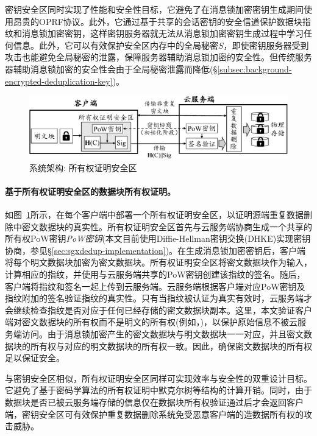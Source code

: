 密钥安全区同时实现了性能和安全性目标，它避免了在消息锁加密密钥生成期间使用昂贵的OPRF协议\cite{bellare2013DupLESS}。此外，它通过基于共享的会话密钥的安全信道保护数据块指纹和消息锁加密密钥，这样密钥服务器就无法从消息锁加密密钥生成过程中学习任何信息。此外，它可以有效保护安全区内存中的全局秘密$S$，即使密钥服务器受到攻击也能避免全局秘密的泄露，保障服务器辅助消息锁加密的安全性。但传统服务器辅助消息锁加密的安全性会由于全局秘密泄露而降低(\S\ref{subsec:background-encrypted-deduplication-key})。

\begin{figure}[!htb]
  \centering
  \includegraphics[width=\textwidth]{pic/sgxdedup/pow.pdf}
  \caption{\sysnameS 系统架构: 所有权证明安全区}
  \label{fig:sgxdedup-overview-pow}
\end{figure}

\paragraph*{基于所有权证明安全区的数据块所有权证明。}如图~\ref{fig:sgxdedup-overview-pow}所示，\sysnameS 在每个客户端中部署一个所有权证明安全区，以证明源端重复数据删除中密文数据块的真实性。所有权证明安全区首先与云服务端协商生成一个共享的所有权PoW密钥\textit{PoW密钥}(本文目前使用Diffie-Hellman密钥交换(DHKE)实现密钥协商，参见\S\ref{sec:sgxdedup-implementation})。在生成消息锁加密密钥后，客户端将每个明文数据块加密为密文数据块。所有权证明安全区将密文数据块作为输入，计算相应的指纹，并使用与云服务端共享的PoW密钥创建该指纹的签名。随后，客户端将指纹和签名一起上传到云服务端。云服务端根据客户端对应PoW密钥及指纹附加的签名验证指纹的真实性。只有当指纹被认证为真实有效时，云服务端才会继续检查指纹是否对应于任何已经存储的密文数据块副本。这里，本文验证客户端对密文数据块的所有权而不是明文的所有权(例如，\cite{halevi11})，以保护原始信息不被云服务端访问。由于消息锁加密产生的密文数据块与明文数据块一一对应，并且密文数据块的所有权与对应的明文数据块的所有权一致。因此，确保密文数据块的所有权足以保证安全。

与密钥安全区相似，所有权证明安全区同样可实现效率与安全性的双重设计目标。它避免了基于密码学算法的所有权证明中默克尔树等结构的计算开销。同时，由于数据块是否已被云服务端存储的信息仅在数据块所有权验证通过后才会返回客户端，密钥安全区可有效保护重复数据删除系统免受恶意客户端的造数据所有权的攻击威胁。

